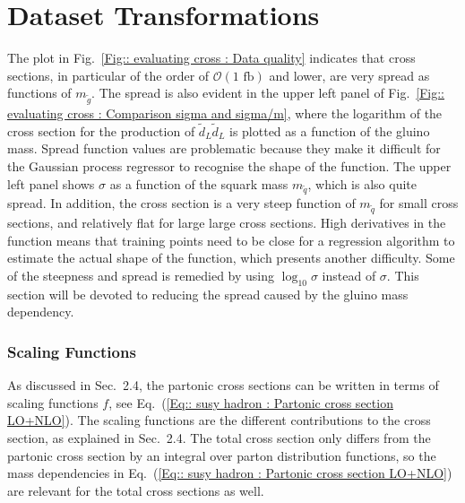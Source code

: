 \documentclass[twoside,english]{uiofysmaster}
\begin{document}
{{\section{Dataset Transformations}

The plot in Fig.~\ref{Fig:: evaluating cross : Data quality} indicates that cross sections, in particular of the order of $\mathcal{O}(1 \text{ fb})$ and lower, are very spread as functions of $m_{\widetilde{g}}$. The spread is also evident in the upper left panel of Fig.~\ref{Fig:: evaluating cross : Comparison sigma and sigma/m}, where the logarithm of the cross section for the production of $\widetilde{d}_L \widetilde{d}_L$ is plotted as a function of the gluino mass. Spread function values are problematic because they make it difficult for the Gaussian process regressor to recognise the shape of the function. The upper left panel shows $\sigma$ as a function of the squark mass $m_{\widetilde{q}}$, which is also quite spread. In addition, the cross section is a very steep function of $m_{\widetilde{q}}$ for small cross sections, and relatively flat for large large cross sections. High derivatives in the function means that training points need to be close for a regression algorithm to estimate the actual shape of the function, which presents another difficulty. Some of the steepness and spread is remedied by using $\log_{10} \sigma$ instead of $\sigma$. This section will be devoted to reducing the spread caused by the gluino mass dependency.

\subsubsection{Scaling Functions}\label{Sec:: evaluating cross : Scaling Functions}

As discussed in Sec.~2.4, the partonic cross sections can be written in terms of scaling functions $f$, see Eq.~(\ref{Eq:: susy hadron : Partonic cross section LO+NLO}). The scaling functions are the different contributions to the cross section, as explained in Sec.~2.4. The total cross section only differs from the partonic cross section by an integral over parton distribution functions, so the mass dependencies in Eq.~(\ref{Eq:: susy hadron : Partonic cross section LO+NLO}) are relevant for the total cross sections as well.

}}
\end{document}
